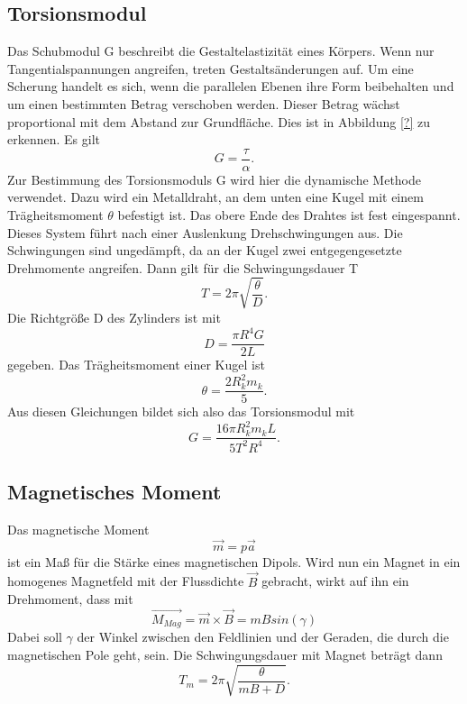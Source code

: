 \documentclass[11pt,ngerman,a4paper]{article}
\begin{document}
\subsection{Torsionsmodul}
Das Schubmodul G beschreibt die Gestaltelastizität eines Körpers. Wenn nur Tangentialspannungen angreifen, treten Gestaltsänderungen auf. Um eine Scherung handelt es sich, wenn die parallelen Ebenen ihre Form beibehalten und um einen bestimmten Betrag verschoben werden. Dieser Betrag wächst proportional mit dem Abstand zur Grundfläche. Dies ist in Abbildung \ref{?} zu erkennen.
Es gilt
\begin{equation}
\label{4}
G = \frac{\tau}{\alpha}.
\end{equation}
Zur Bestimmung des Torsionsmoduls G wird hier die dynamische Methode verwendet. Dazu wird ein Metalldraht, an dem unten eine Kugel mit einem Trägheitsmoment $\theta$ befestigt ist. Das obere Ende des Drahtes ist fest eingespannt. Dieses System führt nach einer Auslenkung Drehschwingungen aus. Die Schwingungen sind ungedämpft, da an der Kugel zwei entgegengesetzte Drehmomente angreifen.
Dann gilt für die Schwingungsdauer T
\begin{equation}
\label{5}
T=2\pi \sqrt{\frac{\theta}{D}}.
\end{equation}
Die Richtgröße D des Zylinders ist mit
\begin{equation}
\label{6}
D=\frac{\pi  R^4 G}{2L}
\end{equation}
gegeben. Das Trägheitsmoment einer Kugel ist
\begin{equation}
\label{7}
\theta=\frac{2R_k^2m_k}{5}.
\end{equation}
Aus diesen Gleichungen bildet sich also das Torsionsmodul mit
\begin{equation}
\label{8}
G=\frac{16\pi R_k^2m_kL}{5T^2R^4}.
\end{equation}
\subsection{Magnetisches Moment}
Das magnetische Moment
\begin{equation}
\label{9}
\vec{m}=p\vec{a} 
\end{equation}
ist ein Maß für die Stärke eines magnetischen Dipols. Wird nun ein Magnet in ein homogenes Magnetfeld mit der Flussdichte $\vec{B}$  gebracht, wirkt auf ihn ein Drehmoment, dass mit
\begin{equation}
\label{10}
\vec{M_{Mag}}=\vec{m} \times \vec{B} = m B sin(\gamma)
\end{equation}
Dabei soll $\gamma$ der Winkel zwischen den Feldlinien und der Geraden, die durch die magnetischen Pole geht, sein.
Die Schwingungsdauer mit Magnet beträgt dann
\begin{equation}
\label{11}
T_m=2\pi \sqrt{\frac{\theta}{mB+D}}.
\end{equation}
\end{document}
